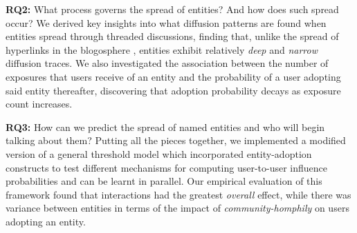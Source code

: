 \documentclass[review]{elsarticle}
\begin{document}
 \textbf{RQ2:} What process governs the spread of entities? And how does such spread occur?
We derived key insights into what diffusion patterns are found when entities spread through threaded discussions,  finding that, unlike the spread of hyperlinks in the blogosphere \cite{leskovec2007patterns}, entities exhibit relatively \emph{deep} and \emph{narrow} diffusion traces.
We also investigated the association between the number of exposures that users receive of an entity and the probability of a user adopting said entity thereafter, discovering that adoption probability decays as exposure count increases.

 \textbf{RQ3:} How can we predict the spread of named entities and who will begin talking about them?	
Putting all the pieces together, we implemented a modified version of a general threshold model which incorporated entity-adoption constructs to test different mechanisms for computing user-to-user influence probabilities and can be learnt in parallel.
Our empirical evaluation of this framework found that interactions had the greatest \emph{overall} effect, while there was variance between entities in terms of the impact of \emph{community-homphily} on users adopting an entity.


\end{document}
